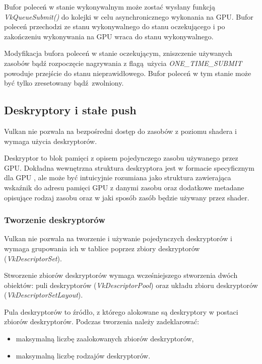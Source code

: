 Bufor poleceń w stanie wykonywalnym może zostać wysłany funkcją \textit{VkQueueSubmit()} do kolejki w celu asynchronicznego wykonania na GPU.
Bufor poleceń przechodzi ze stanu wykonywalnego do stanu oczekującego i po zakończeniu wykonywania na GPU wraca do stanu wykonywalnego.

Modyfikacja bufora poleceń w stanie oczekującym, zniszczenie używanych zasobów bądź rozpoczęcie nagrywania z flagą użycia \textit{ONE\_TIME\_SUBMIT} powoduje przejście do stanu nieprawidłowego.
Bufor poleceń w tym stanie może być tylko zresetowany bądź zwolniony.



\subsection{Deskryptory i stałe push}

Vulkan nie pozwala na bezpośredni dostęp do zasobów z poziomu shadera i wymaga użycia deskryptorów.

Deskryptor to blok pamięci z opisem pojedynczego zasobu używanego przez GPU. Dokładna wewnętrzna struktura deskryptora jest w formacie specyficznym dla GPU \cite{DESCRIPTORSHARD}, ale może być intuicyjnie rozumiana jako struktura zawierająca wskaźnik do adresu pamięci GPU z danymi zasobu oraz dodatkowe metadane opisujące rodzaj zasobu oraz w jaki sposób zasób będzie używany przez shader.

\subsubsection{Tworzenie deskryptorów}

Vulkan nie pozwala na tworzenie i używanie pojedynczych deskryptorów i wymaga grupowania ich w tablice poprzez zbiory deskryptorów (\textit{VkDescriptorSet}).

Stworzenie zbiorów deskryptorów wymaga wcześniejszego stworzenia dwóch obiektów: puli deskryptorów (\textit{VkDescriptorPool})
oraz układu zbioru deskryptorów (\textit{VkDescriptorSetLayout}).

Pula deskryptorów to źródło, z którego alokowane są deskryptory w postaci zbiorów deskryptorów. Podczas tworzenia należy zadeklarować:
\begin{itemize}
	\item maksymalną liczbę zaalokowanych zbiorów deskryptorów,
	\item maksymalną liczbę rodzajów deskryptorów.
\end{itemize}

